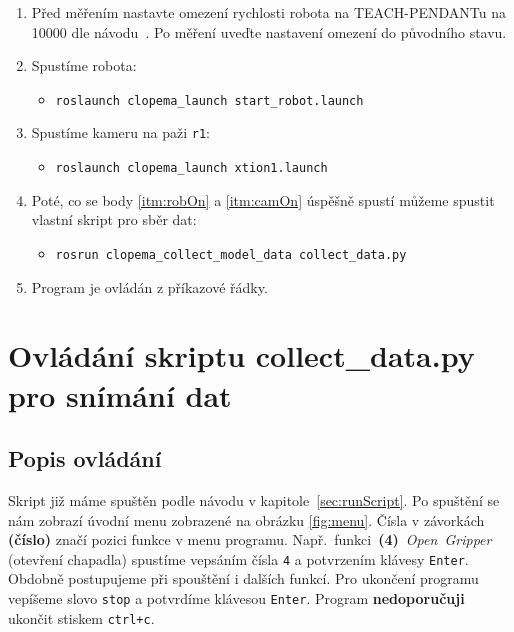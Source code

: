 \documentclass[10pt,a4paper,titlepage,oneside]{report}
\begin{document}
\begin{enumerate}
 
  \item Před měřením nastavte omezení rychlosti robota na TEACH-PENDANTu na 10000 dle návodu~\cite{robotConf}. Po měření uveďte nastavení omezení do původního stavu. 
   
  
  \item \label{itm:robOn} Spustíme robota: 
  	\begin{itemize}  
  		\item \verb|roslaunch clopema_launch start_robot.launch|
  	\end{itemize}
  
  \item \label{itm:camOn} Spustíme kameru na paži \verb|r1|:
  	\begin{itemize}
  		\item \verb|roslaunch clopema_launch xtion1.launch|
 	\end{itemize}
  
  \item Poté, co se body \ref{itm:robOn} a \ref{itm:camOn} úspěšně spustí můžeme spustit vlastní skript pro sběr dat:
  	\begin{itemize}
  		\item \verb|rosrun clopema_collect_model_data collect_data.py|
  	\end{itemize}
  
  \item Program je ovládán z příkazové řádky.
  
\end{enumerate}


\section{Ovládání skriptu collect\_data.py pro snímání dat}
\label{sec:program}

\subsection{Popis ovládání}
Skript již máme spuštěn podle návodu v kapitole~\ref{sec:runScript}. Po spuštění se nám zobrazí úvodní menu zobrazené na obrázku \ref{fig:menu}.
Čísla v závorkách \textbf{(číslo)} značí pozici funkce v menu programu. Např.~funkci~\textbf{(4)}~\textit{Open~Gripper} (otevření chapadla) spustíme vepsáním čísla \verb|4| a potvrzením klávesy \verb|Enter|. Obdobně postupujeme při spouštění i dalších funkcí. Pro ukončení programu vepíšeme slovo \verb|stop| a potvrdíme klávesou \verb|Enter|. Program \textbf{nedoporučuji} ukončit stiskem \verb|ctrl+c|.
\end{document}
